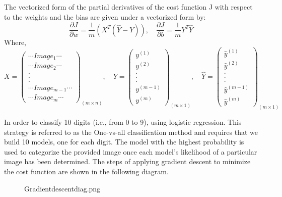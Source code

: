 \documentclass[11pt]{article}
\begin{document}
The vectorized form of the partial derivatives of the cost function J
with respect to the weights and the bias are given under a vectorized
form by: \[
\frac{\partial J}{\partial w}=\frac{1}{m}(X^T(\hat{Y}-Y)), \quad \frac{\partial J}{\partial b}=\frac{1}{m}Y^T\hat{Y}
\] Where, \[
X=\left(
\begin{array}{c}
\cdots Image_1\cdots\\
\cdots Image_2\cdots\\
.\\
.\\
.\\
\cdots Image_{m-1}\cdots\\
\cdots Image_{m}\cdots
\end{array}
\right)_{(m\times n)},\quad
Y= \left(
\begin{array}{c}
y^{(1)}\\
y^{(2)}\\
.\\
.\\
.\\
y^{(m-1)}\\
y^{(m)}
\end{array}
\right)_{(m\times 1)},\quad
\hat{Y}= \left(
\begin{array}{c}
\hat{y}^{(1)}\\
\hat{y}^{(2)}\\
.\\
.\\
.\\
\hat{y}^{(m-1)}\\
\hat{y}^{(m)}
\end{array}
\right)_{(m\times 1)}
\]

    In order to classify 10 digits (i.e., from 0 to 9), using logistic
regression. This strategy is referred to as the One-vs-all
classification method and requires that we build 10 models, one for each
digit. The model with the highest probability is used to categorize the
provided image once each model's likelihood of a particular image has
been determined. The steps of applying gradient descent to minimize the
cost function are shown in the following diagram.

\begin{center}
\end{center}
\begin{figure}
\centering
\caption{Gradientdescentdiag.png}
\end{figure}
\end{document}
